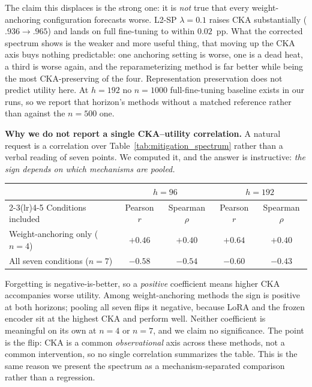 \documentclass{article}
\begin{document}
The claim this displaces is the strong one: it is \emph{not} true that every weight-anchoring
configuration forecasts worse. L2-SP $\lambda{=}0.1$ raises CKA substantially ($.936 \to .965$) and
lands on full fine-tuning to within $0.02$~pp. What the corrected spectrum shows is the weaker and
more useful thing, that moving up the CKA axis buys nothing predictable: one anchoring setting is worse,
one is a dead heat, a third is worse again, and the reparameterizing method is far better while
being the most CKA-preserving of the four. Representation preservation does not predict utility
here. At $h{=}192$ no $n{=}1000$ full-fine-tuning baseline exists in our runs, so we report that
horizon's methods without a matched reference rather than against the $n{=}500$ one.



\textbf{Why we do not report a single CKA--utility correlation.}
A natural request is a correlation over Table~\ref{tab:mitigation_spectrum} rather than a verbal
reading of seven points. We computed it, and the answer is instructive: \emph{the sign depends on
which mechanisms are pooled.}

\begin{center}
\small
\begin{tabular}{@{}lcccc@{}}
\toprule
& \multicolumn{2}{c}{$h{=}96$} & \multicolumn{2}{c}{$h{=}192$} \\
\cmidrule(lr){2-3}\cmidrule(lr){4-5}
Conditions included & Pearson $r$ & Spearman $\rho$ & Pearson $r$ & Spearman $\rho$ \\
\midrule
Weight-anchoring only ($n{=}4$) & $+0.46$ & $+0.40$ & $+0.64$ & $+0.40$ \\
All seven conditions ($n{=}7$)  & $-0.58$ & $-0.54$ & $-0.60$ & $-0.43$ \\
\bottomrule
\end{tabular}
\end{center}

Forgetting is negative-is-better, so a \emph{positive} coefficient means higher CKA accompanies
worse utility. Among weight-anchoring methods the sign is positive at both horizons; pooling all
seven flips it negative, because LoRA and the frozen encoder sit at the highest CKA and perform
well. Neither coefficient is meaningful on its own at $n{=}4$ or $n{=}7$, and we claim no
significance. The point is the flip: CKA is a common \emph{observational} axis across these
methods, not a common intervention, so no single correlation summarizes the table. This is the
same reason we present the spectrum as a mechanism-separated comparison rather than a regression.
\end{document}
